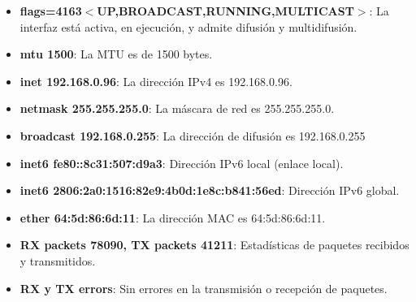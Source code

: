 \begin{itemize}
    \begin{itemize}
        \item \textbf{flags=4163$<$UP,BROADCAST,RUNNING,MULTICAST$>$}:  La interfaz está activa, en ejecución, y admite difusión y multidifusión.\\
        \item \textbf{mtu 1500}: La MTU es de 1500 bytes.\\
        \item \textbf{inet 192.168.0.96}: La dirección IPv4 es 192.168.0.96.\\
        \item \textbf{netmask 255.255.255.0}: La máscara de red es 255.255.255.0.\\
        \item \textbf{broadcast 192.168.0.255}: La dirección de difusión es 192.168.0.255\\
        \item \textbf{inet6 fe80::8c31:507:d9a3}: Dirección IPv6 local (enlace local).\\
        \item \textbf{inet6 2806:2a0:1516:82e9:4b0d:1e8c:b841:56ed}: Dirección IPv6 global.\\
        \item \textbf{ether 64:5d:86:6d:11}: La dirección MAC es 64:5d:86:6d:11.\\
        \item \textbf{RX packets 78090, TX packets 41211}: Estadísticas de paquetes recibidos y transmitidos.\\
        \item \textbf{RX y TX errors}: Sin errores en la transmisión o recepción de paquetes.\\
    \end{itemize}
    

\end{itemize}
